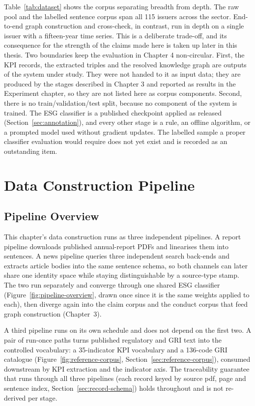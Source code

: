 \documentclass[fontsize=12pt,oneside,headings=small]{scrreprt}
\begin{document}
Table~\ref{tab:dataset} shows the corpus separating breadth from depth. The raw pool and the labelled sentence corpus span all 115 issuers across the sector. End-to-end graph construction and cross-check, in contrast, run in depth on a single issuer with a fifteen-year time series. This is a deliberate trade-off, and its consequence for the strength of the claims made here is taken up later in this thesis.
\label{sec:not-dataset}
Two boundaries keep the evaluation in Chapter 4 non-circular. First, the KPI records, the extracted triples and the resolved knowledge graph are outputs of the system under study. They were not handed to it as input data; they are produced by the stages described in Chapter 3 and reported as results in the Experiment chapter, so they are not listed here as corpus components. Second, there is no train/validation/test split, because no component of the system is trained. The ESG classifier is a published checkpoint applied as released (Section~\ref{sec:annotation}), and every other stage is a rule, an offline algorithm, or a prompted model used without gradient updates. The labelled sample a proper classifier evaluation would require does not yet exist and is recorded as an outstanding item.
\section{Data Construction Pipeline}
\subsection{Pipeline Overview}

This chapter's data construction runs as three independent pipelines. A report pipeline downloads published annual-report PDFs and linearises them into sentences. A news pipeline queries three independent search back-ends and extracts article bodies into the same sentence schema, so both channels can later share one identity space while staying distinguishable by a source-type stamp. The two run separately and converge through one shared ESG classifier (Figure~\ref{fig:pipeline-overview}, drawn once since it is the same weights applied to each), then diverge again into the claim corpus and the conduct corpus that feed graph construction (Chapter~3).

A third pipeline runs on its own schedule and does not depend on the first two. A pair of run-once paths turns published regulatory and GRI text into the controlled vocabulary: a 35-indicator KPI vocabulary and a 136-code GRI catalogue (Figure~\ref{fig:reference-corpus}, Section~\ref{sec:reference-corpus}), consumed downstream by KPI extraction and the indicator axis. The traceability guarantee that runs through all three pipelines (each record keyed by source pdf, page and sentence index, Section~\ref{sec:record-schema}) holds throughout and is not re-derived per stage.
\end{document}
